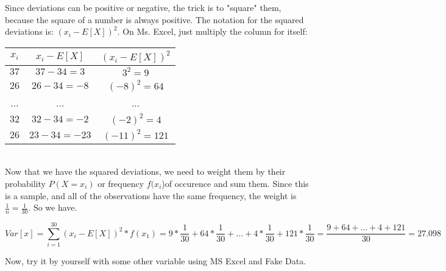 \documentclass[11pt]{article}
\begin{document}
Since deviations can be positive or negative, the trick is to "square" them, because the square of a number is always positive. The notation for the squared deviations is: $(x_i - E[X])^2$. On Ms. Excel, just multiply the column for itself:

\begin{tabular}{|c|c|c|}
	$x_i$ & $x_i - E[X]$ & $(x_i - E[X])^2$\\
	\hline
	$37$ & $37 - 34 = 3$ & $3^2 = 9$\\
	$26$ & $26 - 34  = -8$ & $(-8)^2 = 64$\\
	... & ... & ...\\
	$32$ & $32 - 34  = -2$ & $(-2)^2 = 4$\\
	$26$ & $23 - 34  = -23$ & $(-11)^2 = 121$\\
\end{tabular}\\

Now that we have the squared deviations, we need to weight them by their probability $P(X=x_i)$ or frequency $f(x_i$)of occurence and sum them. Since this is a sample, and all of the observations have the same frequency, the weight is $\frac{1}{n} = \frac{1}{30}$. So we have.

\[Var[x] = \sum_{i=1}^{30} (x_i - E[X])^2 * f(x_1) = 9 * \frac{1}{30} + 64 * \frac{1}{30} + ... + 4 * \frac{1}{30} + 121 * \frac{1}{30} = \frac{9 + 64 + ... + 4 + 121}{30} = 27.098\]

Now, try it by yourself with some other variable using MS Excel and Fake Data.
	
\end{document}
